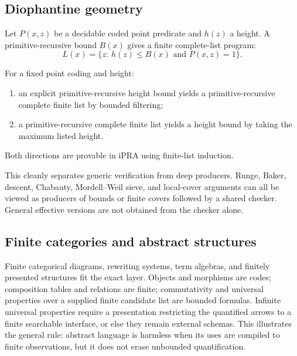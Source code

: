 \subsection{Diophantine geometry}

Let \(P(x,z)\) be a decidable coded point predicate and \(h(z)\) a height.  A primitive-recursive bound \(B(x)\) gives a finite complete-list program:
\[
  L(x)=\{z:\ h(z)\leq B(x)\text{ and }P(x,z)=1\}.
\]

\begin{theorem}
For a fixed point coding and height:
\begin{enumerate}
\item an explicit primitive-recursive height bound yields a primitive-recursive complete finite list by bounded filtering;
\item a primitive-recursive complete finite list yields a height bound by taking the maximum listed height.
\end{enumerate}
Both directions are provable in iPRA using finite-list induction.
\end{theorem}

This cleanly separates generic verification from deep producers.  Runge, Baker, descent, Chabauty, Mordell--Weil sieve, and local-cover arguments can all be viewed as producers of bounds or finite covers followed by a shared checker.  General effective versions are not obtained from the checker alone.

\subsection{Finite categories and abstract structures}

Finite categorical diagrams, rewriting systems, term algebras, and finitely presented structures fit the exact layer.  Objects and morphisms are codes; composition tables and relations are finite; commutativity and universal properties over a supplied finite candidate list are bounded formulas.  Infinite universal properties require a presentation restricting the quantified arrows to a finite searchable interface, or else they remain external schemas.  This illustrates the general rule: abstract language is harmless when its uses are compiled to finite observations, but it does not erase unbounded quantification.
